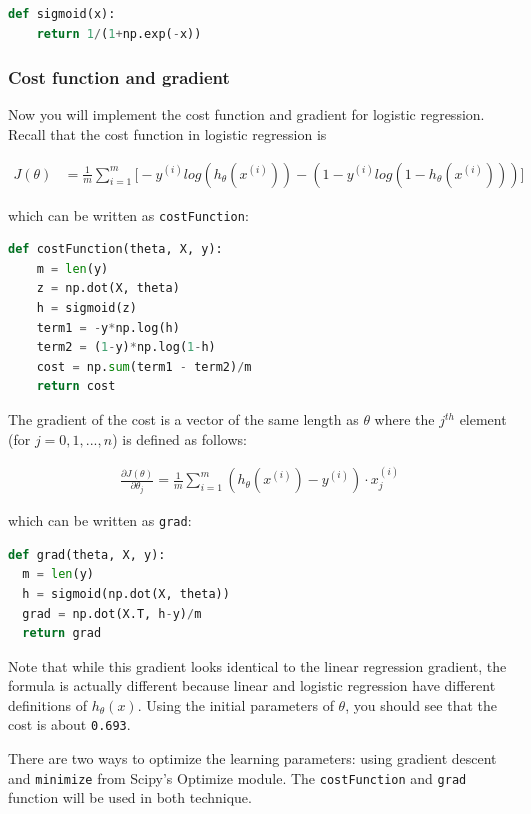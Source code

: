 \documentclass[12pt]{article}
\begin{document}
\begin{lstlisting}[language=Python]
  def sigmoid(x):
    return 1/(1+np.exp(-x))
\end{lstlisting}

\subsubsection{Cost function and gradient}

Now you will implement the cost function and gradient for logistic regression. Recall that the cost function in logistic regression is

\begin{align}
  J(\theta) & = \frac{1}{m}\sum_{i=1}^m{\big[-y^{(i)}log(h_\theta(x^{(i)}))-(1-y^{(i)}log(1-h_\theta(x^{(i)})))\big]}
\end{align}

which can be written as \texttt{costFunction}:

\begin{lstlisting}[language=Python]
  def costFunction(theta, X, y):
    m = len(y)
    z = np.dot(X, theta)
    h = sigmoid(z)
    term1 = -y*np.log(h)
    term2 = (1-y)*np.log(1-h)
    cost = np.sum(term1 - term2)/m
    return cost
\end{lstlisting}

The gradient of the cost is a vector of the same length as $\theta$ where the $j^{th}$ element (for $j = 0, 1, ... , n$) is defined as follows:

\begin{align}
  \frac{\partial J(\theta)}{\partial \theta_j} = \frac{1}{m}\sum_{i=1}^m{(h_\theta(x^{(i)})-y^{(i)})\cdot x_j^{(i)}}
\end{align}

which can be written as \texttt{grad}:

\begin{lstlisting}[language=Python]
  def grad(theta, X, y):
  m = len(y)
  h = sigmoid(np.dot(X, theta))
  grad = np.dot(X.T, h-y)/m
  return grad
\end{lstlisting}

Note that while this gradient looks identical to the linear regression gradient, the formula is actually different because linear and logistic regression have different definitions of $h_\theta(x)$. Using the initial parameters of $\theta$, you should see that the cost is about \texttt{0.693}.

There are two ways to optimize the learning parameters: using gradient descent and \verb|minimize| from Scipy's Optimize module. The \texttt{costFunction} and \texttt{grad} function will be used in both technique.
\end{document}
